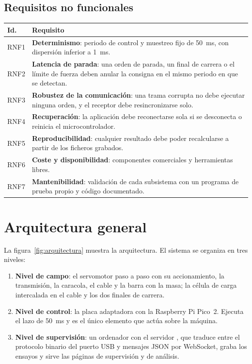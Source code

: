 \subsection{Requisitos no funcionales}

\begin{longtable}{@{}L{0.09\textwidth}L{0.85\textwidth}@{}}
\toprule
\textbf{Id.} & \textbf{Requisito} \\
\midrule
\endhead
RNF1 & \textbf{Determinismo}: periodo de control y muestreo fijo de \SI{50}{\milli\second}, con dispersión inferior a \SI{1}{\milli\second}. \\
RNF2 & \textbf{Latencia de parada}: una orden de parada, un final de carrera o el límite de fuerza deben anular la consigna en el mismo periodo en que se detectan. \\
RNF3 & \textbf{Robustez de la comunicación}: una trama corrupta no debe ejecutar ninguna orden, y el receptor debe resincronizarse solo. \\
RNF4 & \textbf{Recuperación}: la aplicación debe reconectarse sola si se desconecta o reinicia el microcontrolador. \\
RNF5 & \textbf{Reproducibilidad}: cualquier resultado debe poder recalcularse a partir de los ficheros grabados. \\
RNF6 & \textbf{Coste y disponibilidad}: componentes comerciales y herramientas libres. \\
RNF7 & \textbf{Mantenibilidad}: validación de cada subsistema con un programa de prueba propio y código documentado. \\
\bottomrule
\end{longtable}

\section{Arquitectura general}

La figura~\ref{fig:arquitectura} muestra la arquitectura. El sistema se organiza en tres niveles:

\begin{enumerate}
  \item \textbf{Nivel de campo}: el servomotor paso a paso con su accionamiento, la transmisión, la
        caracola, el cable y la barra con la masa; la célula de carga intercalada en el cable y los
        dos finales de carrera.
  \item \textbf{Nivel de control}: la placa adaptadora con la Raspberry Pi Pico~2. Ejecuta el lazo
        de \SI{50}{\milli\second} y es el único elemento que actúa sobre la máquina.
  \item \textbf{Nivel de supervisión}: un ordenador con el servidor , que
        traduce entre el protocolo binario del puerto USB y mensajes JSON por WebSocket, graba los
        ensayos y sirve las páginas de supervisión y de análisis.
\end{enumerate}

